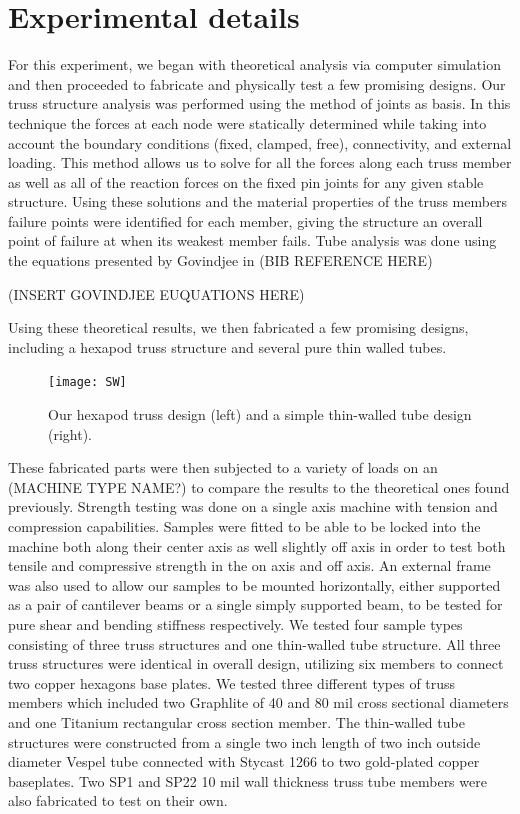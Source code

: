 \documentclass[final]{svjour2}
\begin{document}
\section{Experimental details}
For this experiment, we began with theoretical analysis via computer simulation and then proceeded to fabricate and physically test a few promising designs.  Our truss structure analysis was performed using the method of joints as basis.  In this technique the forces at each node were statically determined while taking into account the boundary conditions (fixed, clamped, free), connectivity, and external loading.  This method allows us to solve for all the forces along each truss member as well as all of the reaction forces on the fixed pin joints for any given stable structure.  Using these solutions and the material properties of the truss members failure points were identified for each member, giving the structure an overall point of failure at when its weakest member fails.  Tube analysis was done using the equations presented by Govindjee in (BIB REFERENCE HERE)

(INSERT GOVINDJEE EUQUATIONS HERE)

Using these theoretical results, we then fabricated a few promising designs, including a hexapod truss structure and several pure thin walled tubes. 

\begin{figure}[!ht]
\begin{center}
\texttt{[image: SW]}
\end{center}
\caption{Our hexapod truss design (left) and a simple thin-walled tube design (right).}
\label{SW}
\end{figure}

These fabricated parts were then subjected to a variety of loads on an (MACHINE TYPE NAME?) to compare the results to the theoretical ones found previously.  Strength testing was done on a single axis machine with tension and compression capabilities. Samples were fitted to be able to be locked into the machine both along their center axis as well slightly off axis in order to test both tensile and compressive strength in the on axis and off axis.  An external frame was also used to allow our samples to be mounted horizontally, either supported as a pair of cantilever beams or a single simply supported beam, to be tested for pure shear and bending stiffness respectively.  We tested four sample types consisting of three truss structures and one thin-walled tube structure.  All three truss structures were identical in overall design, utilizing six members to connect two copper hexagons base plates.  We tested three different types of truss members which included two Graphlite of 40 and 80 mil cross sectional diameters and one Titanium rectangular cross section member. The thin-walled tube structures were constructed from a single two inch length of two inch outside diameter Vespel tube connected with Stycast 1266 to two gold-plated copper baseplates. Two SP1 and SP22 10 mil wall thickness truss tube members were also fabricated to test on their own.
\end{document}
